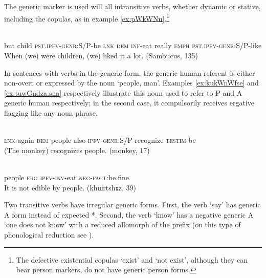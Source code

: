 The generic marker  is used will all intransitive verbs, whether dynamic or stative, including the copulas, as in example \ref{ex:pWkWNu}.\footnote{The defective existential copulas  `exist' and  `not exist', although they can bear person markers, do not have generic person forms. }

\begin{exe}
\ex \label{ex:pWkWNu}
\gll
{} 	 	 	 	 	 	 	 	 \\
but child \textsc{pst.ipfv-genr}:S/P-be \textsc{lnk} \textsc{dem} \textsc{inf}-eat really \textsc{emph} \textsc{pst.ipfv-genr}:S/P-like \\
\glt When (we) were children, (we) liked it a lot. (Sambucus, 135)
\end{exe}

In sentences with verbs in the generic form, the generic  human referent is either non-overt or expressed by the noun  `people, man'. Examples \ref{ex:kukWnWfse} and \ref{ex:tuwGndza.sna} respectively illustrate this noun used to  refer to P and A generic human respectively; in the second case, it   compulsorily receives  ergative flagging  like any   noun phrase.

\begin{exe}
\ex \label{ex:kukWnWfse}
\gll
{}  	  	  	  	  	  	\\
\textsc{lnk} again \textsc{dem} people also \textsc{ipfv-genr:S/P}-recognize \textsc{testim}-be\\
\glt  (The monkey) recognizes people. (monkey, 17)
\end{exe}

\begin{exe}
\ex \label{ex:tuwGndza.sna}
\gll
{}  	  	  	   \\
people \textsc{erg} \textsc{ipfv-inv}-eat \textsc{neg-fact}:be.fine \\
\glt It is not edible by people. (khɯrtshɤz, 39)
\end{exe}


Two transitive verbs have irregular generic forms. First, the verb  `say' has generic A form  instead of expected *. Second, the verb  `know' has a negative generic A  `one does not know' with a reduced allomorph  of the  prefix (on this type of phonological reduction see \citealt{jacques14antipassive}).

